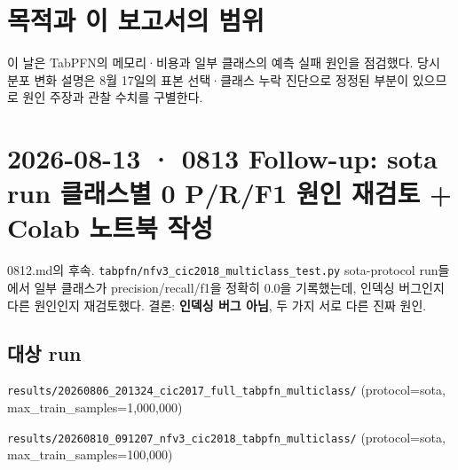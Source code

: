 




\section*{목적과 이 보고서의 범위}

이 날은 TabPFN의 메모리·비용과 일부 클래스의 예측 실패 원인을 점검했다. 당시 분포 변화 설명은 8월 17일의 표본 선택·클래스 누락 진단으로 정정된 부분이 있으므로 원인 주장과 관찰 수치를 구별한다.


\section{2026-08-13 · 0813 Follow-up: sota run 클래스별 0 P/\allowbreak{}R/\allowbreak{}F1 원인 재검토 +\allowbreak{} Colab 노트북 작성}
\label{report:20260813_0813}
0812.md의 후속. \texttt{tabpfn/\allowbreak{}\allowbreak{}n\allowbreak{}fv3\_\allowbreak{}\allowbreak{}cic2\allowbreak{}018\_\allowbreak{}\allowbreak{}mult\allowbreak{}iclass\_\allowbreak{}\allowbreak{}t\allowbreak{}est.\allowbreak{}py} sota-protocol run들에서 일부 클래스가 precision/\allowbreak{}recall/\allowbreak{}f1을 정확히 0.0을 기록했는데, 인덱싱 버그인지 다른 원인인지 재검토했다. 결론: \textbf{인덱싱 버그 아님}, 두 가지 서로 다른 진짜 원인.

\subsection{대상 run}
\par\noindent \textbullet\enspace \texttt{results/\allowbreak{}\allowbreak{}20260806\allowbreak{}\_\allowbreak{}\allowbreak{}201324\_\allowbreak{}\allowbreak{}cic2017\_\allowbreak{}\allowbreak{}full\_\allowbreak{}\allowbreak{}tab\allowbreak{}pfn\_\allowbreak{}\allowbreak{}mult\allowbreak{}iclass/\allowbreak{}\allowbreak{}} (protocol=\allowbreak{}sota, max\_\allowbreak{}train\_\allowbreak{}samples=\allowbreak{}1,000,000)


\par\noindent \textbullet\enspace \texttt{results/\allowbreak{}\allowbreak{}20260810\allowbreak{}\_\allowbreak{}\allowbreak{}091207\_\allowbreak{}\allowbreak{}nfv3\_\allowbreak{}\allowbreak{}cic\allowbreak{}2018\_\allowbreak{}\allowbreak{}tab\allowbreak{}pfn\_\allowbreak{}\allowbreak{}mult\allowbreak{}iclass/\allowbreak{}\allowbreak{}} (protocol=\allowbreak{}sota, max\_\allowbreak{}train\_\allowbreak{}samples=\allowbreak{}100,000)


